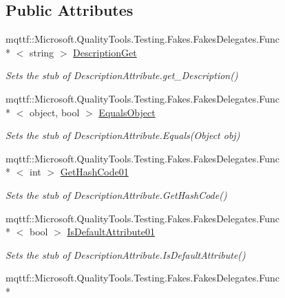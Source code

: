 \subsection*{Public Attributes}
\begin{DoxyCompactItemize}
\item 
mqttf\-::\-Microsoft.\-Quality\-Tools.\-Testing.\-Fakes.\-Fakes\-Delegates.\-Func\\*
$<$ string $>$ \hyperlink{class_system_1_1_component_model_1_1_fakes_1_1_stub_description_attribute_ada068b4e3abde6f012d158944638ae71}{Description\-Get}
\begin{DoxyCompactList}\small\item\em Sets the stub of Description\-Attribute.\-get\-\_\-\-Description()\end{DoxyCompactList}\item 
mqttf\-::\-Microsoft.\-Quality\-Tools.\-Testing.\-Fakes.\-Fakes\-Delegates.\-Func\\*
$<$ object, bool $>$ \hyperlink{class_system_1_1_component_model_1_1_fakes_1_1_stub_description_attribute_aac8eccb95bac47fdbe8064dac9887c4e}{Equals\-Object}
\begin{DoxyCompactList}\small\item\em Sets the stub of Description\-Attribute.\-Equals(\-Object obj)\end{DoxyCompactList}\item 
mqttf\-::\-Microsoft.\-Quality\-Tools.\-Testing.\-Fakes.\-Fakes\-Delegates.\-Func\\*
$<$ int $>$ \hyperlink{class_system_1_1_component_model_1_1_fakes_1_1_stub_description_attribute_a7f551a8acc7df77ce53786065f6dc41b}{Get\-Hash\-Code01}
\begin{DoxyCompactList}\small\item\em Sets the stub of Description\-Attribute.\-Get\-Hash\-Code()\end{DoxyCompactList}\item 
mqttf\-::\-Microsoft.\-Quality\-Tools.\-Testing.\-Fakes.\-Fakes\-Delegates.\-Func\\*
$<$ bool $>$ \hyperlink{class_system_1_1_component_model_1_1_fakes_1_1_stub_description_attribute_a7d6f1a189c0f87b3801ccbe8acf4deda}{Is\-Default\-Attribute01}
\begin{DoxyCompactList}\small\item\em Sets the stub of Description\-Attribute.\-Is\-Default\-Attribute()\end{DoxyCompactList}\item 
mqttf\-::\-Microsoft.\-Quality\-Tools.\-Testing.\-Fakes.\-Fakes\-Delegates.\-Func\\*

\end{DoxyCompactItemize}
